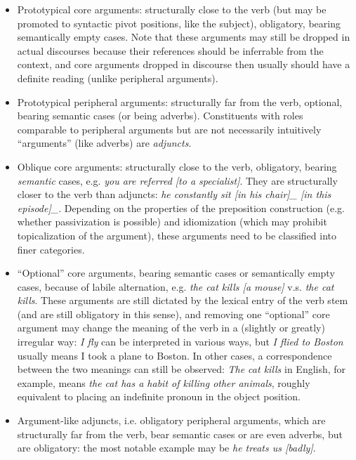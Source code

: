 \documentclass[a4paper, oneside, 12pt]{report}
\newcommand*{\term}[1]{\emph{#1}}
\newcommand{\form}[1]{\emph{#1}}
\begin{document}
\begin{table}[H]
    \caption{Classification of arguments}
    \label{tbl:argument-classification-general}
    \begin{itemize}
        \item Prototypical core arguments: 
        structurally close to the verb
        (but may be promoted to syntactic pivot positions, like the subject),
        obligatory, bearing semantically empty cases.
        Note that these arguments may still be dropped in actual discourses
        because their references should be inferrable from the context,
        and core arguments dropped in discourse then usually should have a definite reading
        (unlike peripheral arguments).
        \item Prototypical peripheral arguments:
        structurally far from the verb,
        optional, bearing semantic cases (or being adverbs).
        Constituents with roles comparable to peripheral arguments 
        but are not necessarily intuitively ``arguments'' (like adverbs)
        are \term{adjuncts}.
        \item Oblique core arguments:
        structurally close to the verb,
        obligatory, bearing \emph{semantic} cases,
        e.g. \form{you are referred [to a specialist]}.
        They are structurally closer to the verb than adjuncts:
        \form{he constantly sit [in his chair]_{} [in this episode]_{\text{adjunct}}}.
        Depending on the properties of the preposition construction
        (e.g. whether passivization is possible)
        and idiomization (which may prohibit topicalization of the argument),
        these arguments need to be classified into finer categories.
        \item ``Optional'' core arguments, bearing semantic cases or semantically empty cases,
        because of labile alternation,
        e.g. \form{the cat kills [a mouse]} v.s. \form{the cat kills}.
        These arguments are still dictated by the lexical entry of the verb stem
        (and are still obligatory in this sense),
        and removing one ``optional''  core argument
        may change the meaning of the verb in a (slightly or greatly) irregular way:
        \form{I fly} can be interpreted in various ways,
        but \form{I flied to Boston} usually means I took a plane to Boston.
        In other cases, a correspondence between the two meanings can still be observed:
        \form{The cat kills} in English, for example, 
        means \form{the cat has a habit of killing other animals},
        roughly equivalent to placing an indefinite pronoun in the object position.
        \item Argument-like adjuncts, i.e. obligatory peripheral arguments, 
        which are structurally far from the verb,
        bear semantic cases or are even adverbs,
        but are obligatory:
        the most notable example may be \form{he treats us [badly]}.
    \end{itemize}
\end{table}
\end{document}
